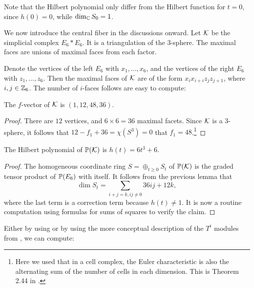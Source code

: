 Note that the Hilbert polynomial only differ from the Hilbert function for $t=0$, since $h(0)=0$, while $\dim_\C S_0=1$. 

We now introduce the central fiber in the discussions onward. Let $\K$ be the simplicial complex $E_6 \ast E_6$. It is a triangulation of the $3$-sphere. The maximal faces are unions of maximal faces from each factor.

Denote the  vertices of the left $E_6$ with $x_1,\ldots,x_6$, and the vertices of the right $E_6$ with $z_1,\ldots,z_6$. Then the maximal faces of $\K$ are of the form $x_ix_{i+i}z_jz_{j+1}$, where $i,j \in \Z_6$. The number of $i$-faces follows are easy to compute:

\begin{lemma}
The $f$-vector of $\K$ is $(1,12,48,36)$. 
\end{lemma}
\begin{proof}
There are $12$ vertices, and $6 \times 6=36$ maximal facets. Since $\K$ is a 3-sphere, it follows that $12-f_1+36=\chi(S^3)=0$ that $f_1=48$.\footnote{Here we used that in a cell complex, the Euler characteristic is also the alternating sum of the number of cells in each dimension. This is Theorem 2.44 in \cite{hatcher_topology}.}
\end{proof}

\begin{lemma}
The Hilbert polynomial of $\P(\K)$ is $h(t)=6t^3+6$.
\end{lemma}
\begin{proof}
The homogeneous coordinate ring $S=\oplus_{t \geq 0} S_t$ of $\P(\K)$ is the graded tensor product of $\P(E_6)$ with itself. It follows from the previous lemma that
\[
\dim S_t = \sum_{i+j=k, ij \neq 0} 36ij + 12k,
\]
where the last term is a correction term because $h(t) \neq 1$. It is now a routine computation using formulas for sums of squares to verify the claim.
\end{proof}

Either by using \MM or by using the more conceptual description of the $T^i$ modules from \cite{deforming_christophersen}, we can compute: 

